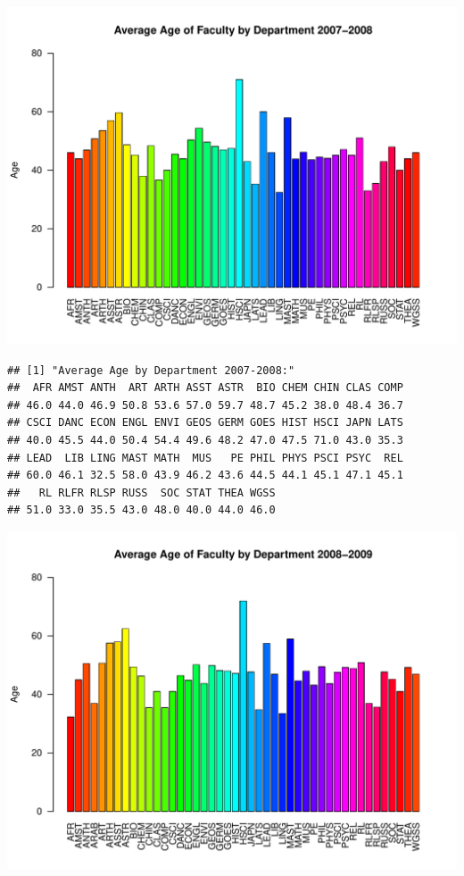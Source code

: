 \documentclass[12pt,a4paper]{article}\usepackage[]{graphicx}\usepackage[]{color}
\makeatletter
\def\maxwidth{ %
  \ifdim\Gin@nat@width>\linewidth
    \linewidth
  \else
    \Gin@nat@width
  \fi
}
\newenvironment{kframe}{%
 \def\at@end@of@kframe{}%
 \ifinner\ifhmode%
  \def\at@end@of@kframe{\end{minipage}}%
  \begin{minipage}{\columnwidth}%
 \fi\fi%
 \def\FrameCommand##1{\hskip\@totalleftmargin \hskip-\fboxsep
 \colorbox{shadecolor}{##1}\hskip-\fboxsep
     \hskip-\linewidth \hskip-\@totalleftmargin \hskip\columnwidth}%
 \MakeFramed {\advance\hsize-\width
   \@totalleftmargin\z@ \linewidth\hsize
   \@setminipage}}%
 {\par\unskip\endMakeFramed%
 \at@end@of@kframe}
\newenvironment{knitrout}{}{} %
\theoremstyle{definition}
\makeatother
\begin{document}
\begin{knitrout}
\includegraphics[width=\maxwidth]{figure/unnamed-chunk-9-4} 
\begin{kframe}\begin{verbatim}
## [1] "Average Age by Department 2007-2008:"
##  AFR AMST ANTH  ART ARTH ASST ASTR  BIO CHEM CHIN CLAS COMP 
## 46.0 44.0 46.9 50.8 53.6 57.0 59.7 48.7 45.2 38.0 48.4 36.7 
## CSCI DANC ECON ENGL ENVI GEOS GERM GOES HIST HSCI JAPN LATS 
## 40.0 45.5 44.0 50.4 54.4 49.6 48.2 47.0 47.5 71.0 43.0 35.3 
## LEAD  LIB LING MAST MATH  MUS   PE PHIL PHYS PSCI PSYC  REL 
## 60.0 46.1 32.5 58.0 43.9 46.2 43.6 44.5 44.1 45.1 47.1 45.1 
##   RL RLFR RLSP RUSS  SOC STAT THEA WGSS 
## 51.0 33.0 35.5 43.0 48.0 40.0 44.0 46.0
\end{verbatim}
\end{kframe}
\includegraphics[width=\maxwidth]{figure/unnamed-chunk-9-5} 

\end{knitrout}
\end{document}
